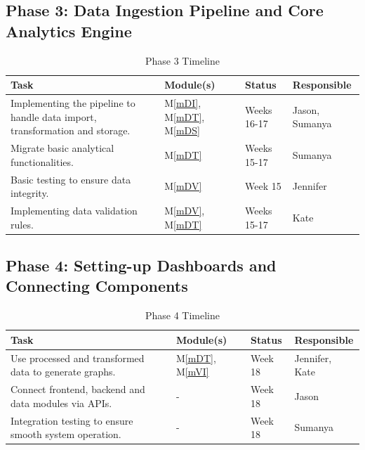 \documentclass[12pt, titlepage]{article}
\newcommand{\mref}[1]{M\ref{#1}}
\begin{document}
\subsection{Phase 3: Data Ingestion Pipeline and Core Analytics Engine} 
    \begin{table}[H]
      \centering
      \begin{tabular}{p{} p{} p{} p{}}
      \toprule
      \textbf{Task} & \textbf{Module(s)} & \textbf{Status} & \textbf{Responsible}\\
      \midrule
      Implementing the pipeline to handle data import, transformation and storage. & 
      \mref{mDI}, \mref{mDT}, \mref{mDS} & Weeks 16-17 & Jason, Sumanya\\
      \midrule
      Migrate basic analytical functionalities. & \mref{mDT} & Weeks 15-17  & Sumanya\\
      Basic testing to ensure data integrity.  & \mref{mDV} & Week 15 & Jennifer\\
      Implementing data validation rules. & \mref{mDV}, \mref{mDT} & Weeks 15-17 & Kate\\
      \bottomrule
      \end{tabular}
      \caption{Phase 3 Timeline}
      \label{TblT3}
    \end{table}

\subsection{Phase 4: Setting-up Dashboards and Connecting Components}
    \begin{table}[H]
      \centering
      \begin{tabular}{p{} p{} p{} p{}}
      \toprule
      \textbf{Task} & \textbf{Module(s)} & \textbf{Status} & \textbf{Responsible}\\
      \midrule
      Use processed and transformed data to generate graphs. & \mref{mDT}, \mref{mVI} & Week 18 & Jennifer, Kate\\
      \midrule
      Connect frontend, backend and data modules via APIs. & - & Week 18  & Jason\\
      Integration testing to ensure smooth system operation. & - & Week 18 & Sumanya\\
      \bottomrule
      \end{tabular}
      \caption{Phase 4 Timeline}
      \label{TblT4}
    \end{table}
\end{document}
